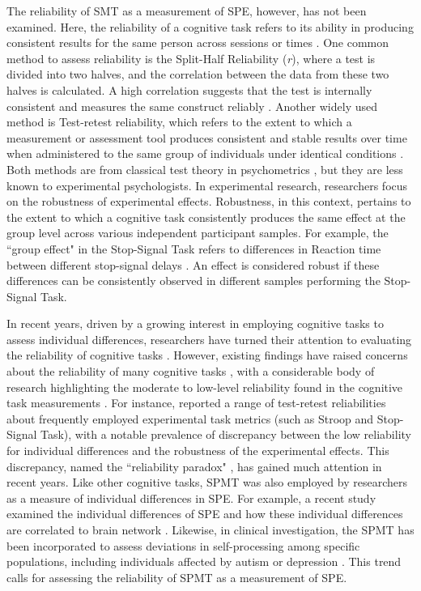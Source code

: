 \documentclass[sn-apa]{sn-jnl}%
\theoremstyle{thmstyleone}%
\theoremstyle{thmstyletwo}%
\theoremstyle{thmstylethree}%
\begin{document}
The reliability of SMT as a measurement of SPE, however, has not been examined. Here, the reliability of a cognitive task refers to its ability in producing consistent results for the same person across sessions or times \parencite{parsons2019psychological,zorowitz2023}. One common method to assess reliability is the Split-Half Reliability (\textit{r}), where a test is divided into two halves, and the correlation between the data from these two halves is calculated. A high correlation suggests that the test is internally consistent and measures the same construct reliably \parencite{pronk2022methods}. Another widely used method is Test-retest reliability, which refers to the extent to which a measurement or assessment tool produces consistent and stable results over time when administered to the same group of individuals under identical conditions \parencite{kline2015handbook}. Both methods are from classical test theory in psychometrics \parencite{borsboom2005measuring}, but they are less known to experimental psychologists. In experimental research, researchers focus on the robustness of experimental effects. Robustness, in this context, pertains to the extent to which a cognitive task consistently produces the same effect at the group level across various independent participant samples. For example, the ``group effect" in the Stop-Signal Task refers to differences in Reaction time between different stop-signal delays \parencite{hedge2018reliability}. An effect is considered robust if these differences can be consistently observed in different samples performing the Stop-Signal Task.

In recent years, driven by a growing interest in employing cognitive tasks to assess individual differences, researchers have turned their attention to evaluating the reliability of cognitive tasks \parencite[e.g.,][]{hedge2018reliability,kucina2023calibration}. However, existing findings have raised concerns about the reliability of many cognitive tasks \parencite{rouder2019psychometrics, karvelis2023individual}, with a  considerable body of research highlighting the moderate to low-level reliability found in the cognitive task measurements \parencite{clark2022test,green2016use,enkavi2019large}. For instance, \textcite{hedge2018reliability} reported a range of test-retest reliabilities about frequently employed experimental task metrics (such as Stroop and Stop-Signal Task), with a notable prevalence of discrepancy between the low reliability for individual differences and the robustness of the experimental effects. This discrepancy, named the ``reliability paradox" \parencite{logie1996group}, has gained much attention in recent years. Like other cognitive tasks, SPMT was also employed by researchers as a measure of individual differences in SPE. For example, a recent study examined the individual differences of SPE and how these individual differences are correlated to brain network \parencite{zhang2023decoding}. Likewise, in clinical investigation, the SPMT has been incorporated to assess deviations in self-processing among specific populations, including individuals affected by autism or depression \parencite{hobbs2023self, liu2022depression}. This trend calls for assessing the reliability of SPMT as a measurement of SPE. 
\end{document}
